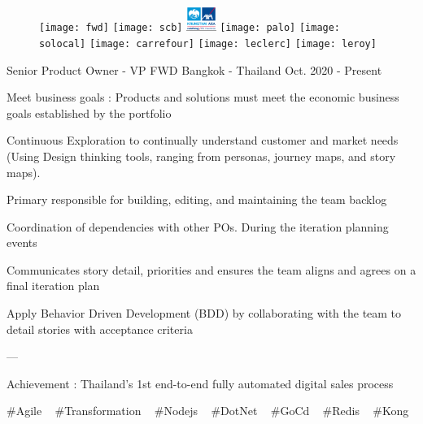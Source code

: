 

\begin{cventries}


    \begin{figure}[h]
    \texttt{[image: fwd]}
    \texttt{[image: scb]}
    \includegraphics[height=0.8cm]{axa}
    \texttt{[image: palo]}
    \texttt{[image: solocal]}
    \texttt{[image: carrefour]}
    \texttt{[image: leclerc]}
    \texttt{[image: leroy]}
    \end{figure}

  \cventry
    {Senior Product Owner - VP} %
    {FWD} %
    {Bangkok - Thailand} %
    {Oct. 2020 - Present} %
    {
      \begin{cvitems} %
        \item {Meet business goals : Products and solutions must meet the economic business goals established by the portfolio}
        \item {Continuous Exploration to continually understand customer and market needs (Using Design thinking tools, ranging from personas, journey maps, and story maps).}
        \item {Primary responsible for building, editing, and maintaining the team backlog}
        \item {Coordination of dependencies with other POs. During the iteration planning events}
        \item {Communicates story detail, priorities and ensures the team aligns and agrees on a final iteration plan}
        \item {Apply Behavior Driven Development (BDD) by collaborating with the team to detail stories with acceptance criteria}
        \item {---}
        \item {Achievement : Thailand's 1st end-to-end fully automated digital sales process}
      \end{cvitems}
    }
    {
      \#Agile ~
      \#Transformation ~
      \#Nodejs ~
      \#DotNet ~
      \#GoCd ~
      \#Redis ~
      \#Kong ~
    }


\end{cventries}
